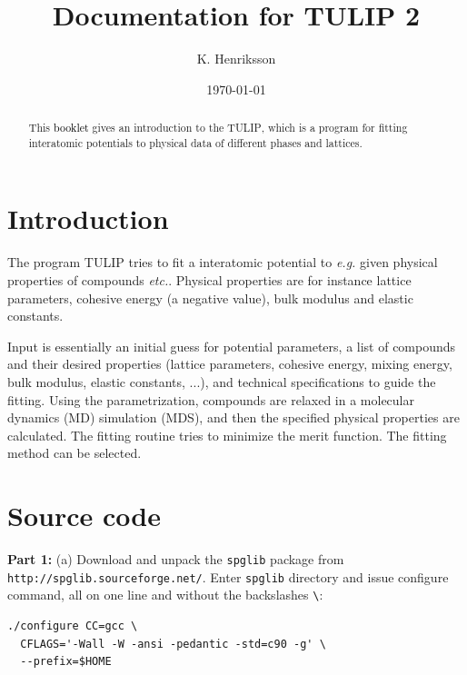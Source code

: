 \documentclass[a4paper,12pt,pdftex,onecolumn]{article}
\newcommand{\eg}{\emph{e.g.}\xspace}
\newcommand{\etc}{\emph{etc.}\xspace}
\begin{document}
\title{
Documentation for \textsc{TULIP} 2
}
\author{K. Henriksson}
\date{\today}

\maketitle

\begin{abstract}
This \textcolor{black}{booklet} gives an introduction to the \textsc{TULIP}, which is
a program for fitting interatomic potentials to physical data
of different phases and lattices.
\end{abstract}

\tableofcontents






\section{Introduction}

The program \textsc{TULIP} tries to fit a interatomic potential
to \eg given physical properties of compounds \etc. Physical properties are
for instance lattice parameters, cohesive energy (a negative value), bulk modulus and
elastic constants.

Input is essentially an initial guess for potential parameters,
a list of compounds and their desired properties
(lattice parameters, cohesive energy, mixing energy, bulk modulus,
elastic constants, ...), and technical specifications to guide the fitting.
Using the parametrization, compounds are relaxed in a molecular
dynamics (MD) simulation (MDS), and then the specified physical properties
are calculated.
The fitting routine tries to minimize the merit function. The fitting method
can be selected.




\section{Source code}

{\large \bf Part 1:}
(a) Download and unpack the \verb+spglib+ package
from \verb+http://spglib.sourceforge.net/+.
Enter \verb+spglib+ directory and issue configure command,
all on one line and without the backslashes \verb+\+:

\begin{framed}
\begin{verbatim}
./configure CC=gcc \
  CFLAGS='-Wall -W -ansi -pedantic -std=c90 -g' \
  --prefix=$HOME
\end{verbatim}
\end{framed}
\end{document}
